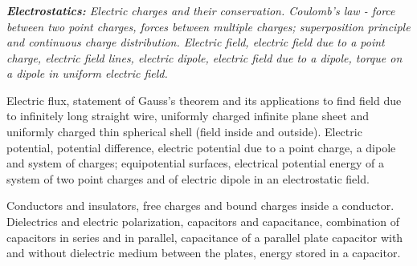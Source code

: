 \begin{frame}[t]
	\frametitle{}
	
	\noindent
	\begin{center}
	\end{center}
	
	\vspace{1em}
	
	\noindent
	\begin{minipage}[t]{\textwidth}
		\itshape\footnotesize
		\textbf{Electrostatics:} Electric charges and their conservation. Coulomb's law - force between two point charges, forces between multiple charges; superposition principle and continuous charge distribution. Electric field, electric field due to a point charge, electric field lines, electric dipole, electric field due to a dipole, torque on a dipole in uniform electric field.
		
		\vspace{0.4em}
		
		Electric flux, statement of Gauss's theorem and its applications to find field due to infinitely long straight wire, uniformly charged infinite plane sheet and uniformly charged thin spherical shell (field inside and outside). Electric potential, potential difference, electric potential due to a point charge, a dipole and system of charges; equipotential surfaces, electrical potential energy of a system of two point charges and of electric dipole in an electrostatic field.
		
		\vspace{0.4em}
		
		Conductors and insulators, free charges and bound charges inside a conductor. Dielectrics and electric polarization, capacitors and capacitance, combination of capacitors in series and in parallel, capacitance of a parallel plate capacitor with and without dielectric medium between the plates, energy stored in a capacitor.
	\end{minipage}
	
\end{frame}

